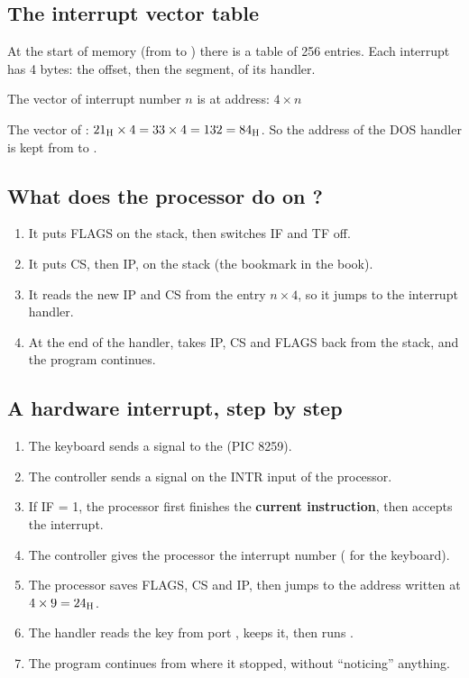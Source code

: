 \subsection{The interrupt vector table}
At the start of memory (from  to ) there is a table of 256 entries. Each interrupt has
4 bytes: the offset, then the segment, of its handler.

\begin{tarif}
    \centering
    The vector of interrupt number $n$ is at address: \quad $4 \times n$
\end{tarif}

\begin{mithal}
    The vector of : $\mbox{21\textsubscript{H}} \times 4 = 33 \times 4 = 132 = \mbox{84\textsubscript{H}}$. So the address of the DOS
    handler is kept from  to .
\end{mithal}

\subsection{What does the processor do on ?}
\begin{enumerate}
    \item It puts FLAGS on the stack, then switches IF and TF off.
    \item It puts CS, then IP, on the stack (the bookmark in the book).
    \item It reads the new IP and CS from the entry $n \times 4$, so it jumps to the interrupt handler.
    \item At the end of the handler,  takes IP, CS and FLAGS back from the stack, and the program continues.
\end{enumerate}

\subsection{A hardware interrupt, step by step}
\begin{khatwa}
    \begin{enumerate}
        \item The keyboard sends a signal to the  (PIC 8259).
        \item The controller sends a signal on the INTR input of the processor.
        \item If IF = 1, the processor first finishes the \textbf{current instruction}, then accepts the interrupt.
        \item The controller gives the processor the interrupt number ( for the keyboard).
        \item The processor saves FLAGS, CS and IP, then jumps to the address written at $4 \times 9 = \mbox{24\textsubscript{H}}$.
        \item The handler reads the key from port , keeps it, then runs .
        \item The program continues from where it stopped, without ``noticing'' anything.
    \end{enumerate}
\end{khatwa}

